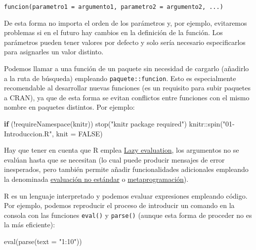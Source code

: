 \documentclass[
]{book}
\newenvironment{Shaded}{\begin{snugshade}}{\end{snugshade}}
\newcommand{\AttributeTok}[1]{\textcolor[rgb]{0.77,0.63,0.00}{#1}}
\newcommand{\ConstantTok}[1]{\textcolor[rgb]{0.00,0.00,0.00}{#1}}
\newcommand{\ControlFlowTok}[1]{\textcolor[rgb]{0.13,0.29,0.53}{\textbf{#1}}}
\newcommand{\FunctionTok}[1]{\textcolor[rgb]{0.00,0.00,0.00}{#1}}
\newcommand{\NormalTok}[1]{#1}
\newcommand{\SpecialCharTok}[1]{\textcolor[rgb]{0.00,0.00,0.00}{#1}}
\newcommand{\StringTok}[1]{\textcolor[rgb]{0.31,0.60,0.02}{#1}}
\theoremstyle{break}
\theoremstyle{nonumberplain}
\begin{document}
\texttt{funcion(parametro1\ =\ argumento1,\ parametro2\ =\ argumento2,\ ...)}

De esta forma no importa el orden de los parámetros y, por ejemplo, evitaremos problemas si en el futuro hay cambios en la definición de la función.
Los parámetros pueden tener valores por defecto y solo sería necesario especificarlos para asignarles un valor distinto.

Podemos llamar a una función de un paquete sin necesidad de cargarlo (añadirlo a la ruta de búsqueda) empleando \texttt{paquete::funcion}.
Esto es especialmente recomendable al desarrollar nuevas funciones (es un requisito para subir paquetes a CRAN), ya que de esta forma se evitan conflictos entre funciones con el mismo nombre en paquetes distintos.
Por ejemplo:

\begin{Shaded}
\begin{Highlighting}[]
\ControlFlowTok{if}\NormalTok{ (}\SpecialCharTok{!}\FunctionTok{requireNamespace}\NormalTok{(knitr)) }\FunctionTok{stop}\NormalTok{(}\StringTok{"\textquotesingle{}knitr\textquotesingle{} package required"}\NormalTok{)}
\NormalTok{knitr}\SpecialCharTok{::}\FunctionTok{spin}\NormalTok{(}\StringTok{"01{-}Introduccion.R"}\NormalTok{, }\AttributeTok{knit =} \ConstantTok{FALSE}\NormalTok{)}
\end{Highlighting}
\end{Shaded}

Hay que tener en cuenta que R emplea \href{https://adv-r.hadley.nz/functions.html\#lazy-evaluation}{Lazy evaluation}, los argumentos no se evalúan hasta que se necesitan (lo cual puede producir mensajes de error inesperados, pero también permite añadir funcionalidades adicionales empleando la denominada \href{http://adv-r.had.co.nz/Computing-on-the-language.html}{evaluación no estándar} o \href{https://adv-r.hadley.nz/metaprogramming.html}{metaprogramación}).

R es un lenguaje interpretado y podemos evaluar expresiones empleando código.
Por ejemplo, podemos reproducir el proceso de introducir un comando en la consola con las funciones \texttt{eval()} y \texttt{parse()} (aunque esta forma de proceder no es la más eficiente):

\begin{Shaded}
\begin{Highlighting}[]
\FunctionTok{eval}\NormalTok{(}\FunctionTok{parse}\NormalTok{(}\AttributeTok{text =} \StringTok{"1:10"}\NormalTok{))}
\end{Highlighting}
\end{Shaded}
\end{document}
